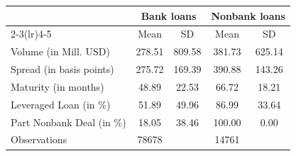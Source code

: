 {
\def\sym#1{\ifmmode^{#1}\else\(^{#1}\)\fi}
\begin{tabular}{l*{2}{cc}}
\hline\hline
                    &\multicolumn{2}{c}{Bank loans}                                                                                           &\multicolumn{2}{c}{Nonbank loans}                                                                                        \\\cmidrule(lr){2-3}\cmidrule(lr){4-5}
                    &                                                        Mean&                                                          SD&                                                        Mean&                                                          SD\\
\hline
Volume (in Mill. USD)&                                                      278.51&                                                      809.58&                                                      381.73&                                                      625.14\\
Spread (in basis points)&                                                      275.72&                                                      169.39&                                                      390.88&                                                      143.26\\
Maturity (in months)&                                                       48.89&                                                       22.53&                                                       66.72&                                                       18.21\\
Leveraged Loan (in \%)&                                                       51.89&                                                       49.96&                                                       86.99&                                                       33.64\\
Part Nonbank Deal (in \%)&                                                       18.05&                                                       38.46&                                                      100.00&                                                        0.00\\
\hline
Observations        &                                                       78678&                                                            &                                                       14761&                                                            \\
\hline\hline
\end{tabular}
}
